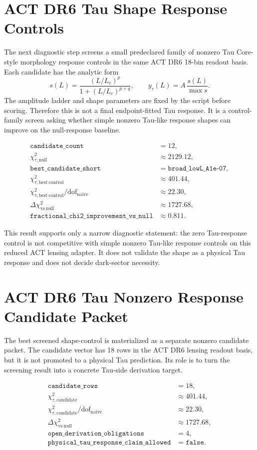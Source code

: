 \documentclass[11pt]{article}
\begin{document}
\section{ACT DR6 Tau Shape Response Controls}

The next diagnostic step screens a small predeclared family of nonzero Tau
Core-style morphology response controls in the same ACT DR6 18-bin readout
basis. Each candidate has the analytic form
\[
s(L)=\frac{(L/L_c)^p}{1+(L/L_c)^{p+q}},\qquad
y_{\tau}(L)=A\,\frac{s(L)}{\max s}.
\]
The amplitude ladder and shape parameters are fixed by the script before
scoring. Therefore this is not a final endpoint-fitted Tau response. It is a
control-family screen asking whether simple nonzero Tau-like response shapes can
improve on the null-response baseline.

\[
\begin{array}{ll}
\texttt{candidate\_count} &= 12,\\
\chi^2_{\tau,\mathrm{null}} &\approx 2129.12,\\
\texttt{best\_candidate\_short} &= \texttt{broad\_lowL\_A1e-07},\\
\chi^2_{\tau,\mathrm{best\ control}} &\approx 401.44,\\
\chi^2_{\tau,\mathrm{best\ control}}/\mathrm{dof}_{\mathrm{naive}}
&\approx 22.30,\\
\Delta\chi^2_{\mathrm{vs\ null}} &\approx 1727.68,\\
\texttt{fractional\_chi2\_improvement\_vs\_null} &\approx 0.811.
\end{array}
\]

This result supports only a narrow diagnostic statement: the zero Tau-response
control is not competitive with simple nonzero Tau-like response controls on
this reduced ACT lensing adapter. It does not validate the shape as a physical
Tau response and does not decide dark-sector necessity.

\section{ACT DR6 Tau Nonzero Response Candidate Packet}

The best screened shape-control is materialized as a separate nonzero candidate
packet. The candidate vector has 18 rows in the ACT DR6 lensing readout basis,
but it is not promoted to a physical Tau prediction. Its role is to turn the
screening result into a concrete Tau-side derivation target.

\[
\begin{array}{ll}
\texttt{candidate\_rows} &= 18,\\
\chi^2_{\tau,\mathrm{candidate}} &\approx 401.44,\\
\chi^2_{\tau,\mathrm{candidate}}/\mathrm{dof}_{\mathrm{naive}}
&\approx 22.30,\\
\Delta\chi^2_{\mathrm{vs\ null}} &\approx 1727.68,\\
\texttt{open\_derivation\_obligations} &= 4,\\
\texttt{physical\_tau\_response\_claim\_allowed} &= \texttt{false}.
\end{array}
\]
\end{document}

